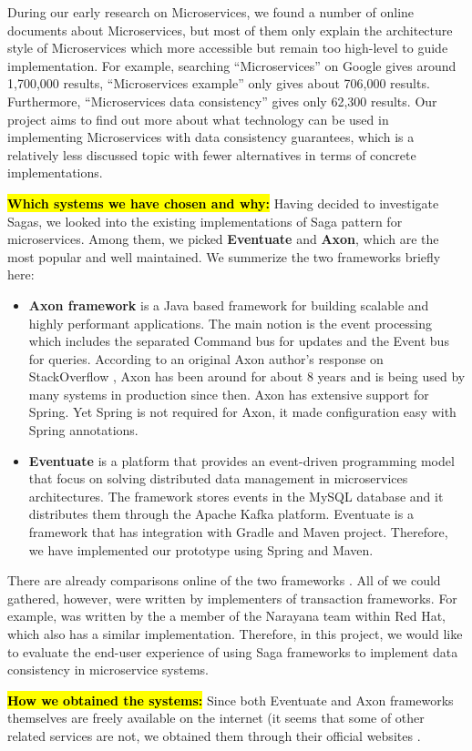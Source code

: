 During our early research on Microservices, we found a number of online documents about Microservices, but most of them only explain the architecture style of Microservices which more accessible but remain too high-level to guide implementation. For example, searching “Microservices” on Google gives around 1,700,000 results, “Microservices example” only gives about 706,000 results. Furthermore, “Microservices data consistency” gives only 62,300 results. Our project aims to find out more about what technology can be used in implementing Microservices with data consistency guarantees, which is a relatively less discussed topic with fewer alternatives in terms of concrete implementations.

\hl{\textbf{Which systems we have chosen and why: }} Having decided to investigate Sagas, we looked into the existing implementations of Saga pattern for microservices. Among them, we picked \textbf{Eventuate} and \textbf{Axon}, which are the most popular and well maintained. We summerize the two frameworks briefly here:

\begin{itemize}
    \item \textbf{Axon framework} \cite{axon} is a Java based framework for building scalable and highly performant applications. The main notion is the event processing which includes the separated Command bus for updates and the Event bus for queries. According to an original Axon author’s response on StackOverflow \cite{comparison}, Axon has been around for about 8 years and is being used by many systems in production since then. Axon has extensive support for Spring. Yet Spring is not required for Axon, it made configuration easy with Spring annotations.
    \item \textbf{Eventuate} \cite{eventuate} is a platform that provides an event-driven programming model that focus on solving distributed data management in microservices architectures. The framework stores events in the MySQL database and it distributes them through the Apache Kafka platform. Eventuate is a framework that has integration with Gradle and Maven project. Therefore, we have implemented our prototype using Spring and Maven.
\end{itemize}

There are already comparisons online of the two frameworks \cite{comparison, stefanko}. All of we could gathered, however, were written by implementers of transaction frameworks. For example, \cite{stefanko} was written by the a member of the Narayana team within Red Hat, which also has a similar implementation. Therefore, in this project, we would like to evaluate the end-user experience of using Saga frameworks to implement data consistency in microservice systems.

\hl{\textbf{How we obtained the systems:}} Since both Eventuate and Axon frameworks themselves are freely available on the internet (it seems that some of other related services are not, we obtained them through their official websites \cite{axon, eventuate}.
